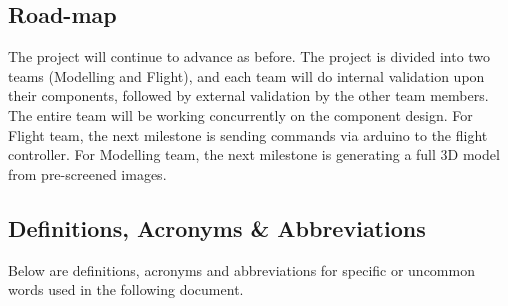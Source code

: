 \documentclass[10pt,letterpaper]{article}
\begin{document}
\subsection{Road-map}
The project will continue to advance as before. The project is divided into two teams (Modelling and Flight), and each team will do internal validation upon their components, followed by external validation by the other team members. The entire team will be working concurrently on the component design. For Flight team, the next milestone is sending commands via arduino to the flight controller. For Modelling team, the next milestone is generating a full 3D model from pre-screened images.


\newpage


\subsection{Definitions, Acronyms \& Abbreviations}
Below are definitions, acronyms and abbreviations for specific or uncommon words used in the following document. 
\end{document}
